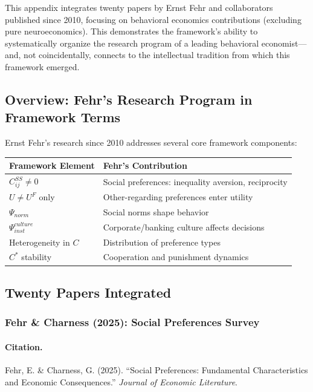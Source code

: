 This appendix integrates twenty papers by Ernst Fehr and collaborators 
published since 2010, focusing on behavioral economics contributions
(excluding pure neuroeconomics). This demonstrates the framework's
ability to systematically organize the research program of a leading
behavioral economist---and, not coincidentally, connects to the
intellectual tradition from which this framework emerged.

\subsection{Overview: Fehr's Research Program in Framework Terms}

Ernst Fehr's research since 2010 addresses several core framework components:

\begin{center}
\renewcommand{\arraystretch}{1.2}
\small
\begin{tabular}{ll}
\hline
\textbf{Framework Element} & \textbf{Fehr's Contribution} \\
\hline
$C^{SS}_{ij} \neq 0$ & Social preferences: inequality aversion, reciprocity \\
$U \neq U^F$ only & Other-regarding preferences enter utility \\
$\Psi_{norm}$ & Social norms shape behavior \\
$\Psi_{inst}^{culture}$ & Corporate/banking culture affects decisions \\
Heterogeneity in $C$ & Distribution of preference types \\
$C^*$ stability & Cooperation and punishment dynamics \\
\hline
\end{tabular}
\end{center}

\subsection{Twenty Papers Integrated}

\subsubsection{Fehr \& Charness (2025): Social Preferences Survey}

\paragraph{Citation.}
Fehr, E. \& Charness, G. (2025). ``Social Preferences: Fundamental 
Characteristics and Economic Consequences.'' \emph{Journal of Economic Literature}.

